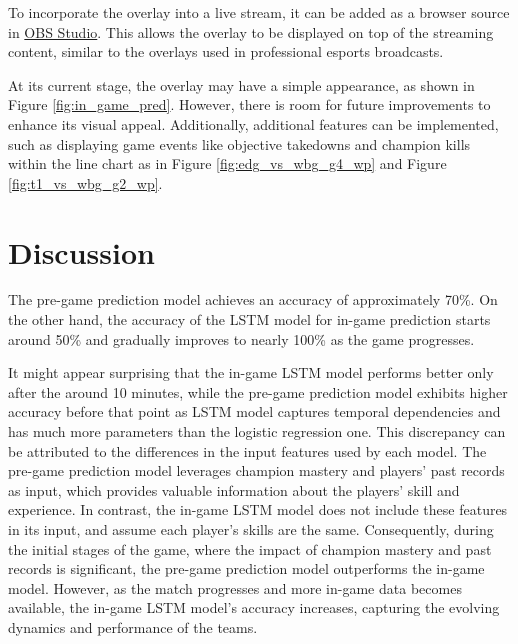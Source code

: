 \documentclass[11pt,a4paper,oneside]{report}
\begin{document}
To incorporate the overlay into a live stream, it can be added as a browser source in \href{https://obsproject.com/}{OBS Studio}. This allows the overlay to be displayed on top of the streaming content, similar to the overlays used in professional esports broadcasts.

At its current stage, the overlay may have a simple appearance, as shown in Figure \ref{fig:in_game_pred}. However, there is room for future improvements to enhance its visual appeal. Additionally, additional features can be implemented, such as displaying game events like objective takedowns and champion kills within the line chart as in Figure \ref{fig:edg_vs_wbg_g4_wp} and Figure \ref{fig:t1_vs_wbg_g2_wp}.


\chapter{Discussion}
\label{discussion}

The pre-game prediction model achieves an accuracy of approximately 70\%. On the other hand, the accuracy of the LSTM model for in-game prediction starts around 50\% and gradually improves to nearly 100\% as the game progresses.

It might appear surprising that the in-game LSTM model performs better only after the around 10 minutes, while the pre-game prediction model exhibits higher accuracy before that point as LSTM model captures temporal dependencies and has much more parameters than the logistic regression one. This discrepancy can be attributed to the differences in the input features used by each model. The pre-game prediction model leverages champion mastery and players' past records as input, which provides valuable information about the players' skill and experience. In contrast, the in-game LSTM model does not include these features in its input, and assume each player's skills are the same. Consequently, during the initial stages of the game, where the impact of champion mastery and past records is significant, the pre-game prediction model outperforms the in-game model. However, as the match progresses and more in-game data becomes available, the in-game LSTM model's accuracy increases, capturing the evolving dynamics and performance of the teams.

\end{document}

